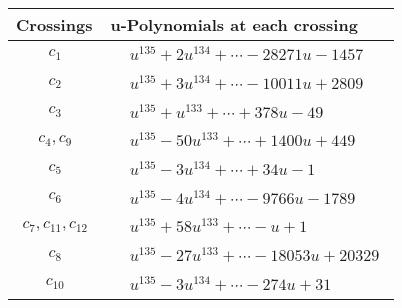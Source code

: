 \documentclass[1p]{elsarticle_modified}
\theoremstyle{definition}
\begin{document}
\begin{tabular}{m{50pt}|m{274pt}}
Crossings & \hspace{64pt}u-Polynomials at each crossing \\
\hline $$\begin{aligned}c_{1}\end{aligned}$$&$\begin{aligned}
&u^{135}+2 u^{134}+\cdots-28271 u-1457
\end{aligned}$\\
\hline $$\begin{aligned}c_{2}\end{aligned}$$&$\begin{aligned}
&u^{135}+3 u^{134}+\cdots-10011 u+2809
\end{aligned}$\\
\hline $$\begin{aligned}c_{3}\end{aligned}$$&$\begin{aligned}
&u^{135}+u^{133}+\cdots+378 u-49
\end{aligned}$\\
\hline $$\begin{aligned}c_{4},c_{9}\end{aligned}$$&$\begin{aligned}
&u^{135}-50 u^{133}+\cdots+1400 u+449
\end{aligned}$\\
\hline $$\begin{aligned}c_{5}\end{aligned}$$&$\begin{aligned}
&u^{135}-3 u^{134}+\cdots+34 u-1
\end{aligned}$\\
\hline $$\begin{aligned}c_{6}\end{aligned}$$&$\begin{aligned}
&u^{135}-4 u^{134}+\cdots-9766 u-1789
\end{aligned}$\\
\hline $$\begin{aligned}c_{7},c_{11},c_{12}\end{aligned}$$&$\begin{aligned}
&u^{135}+58 u^{133}+\cdots- u+1
\end{aligned}$\\
\hline $$\begin{aligned}c_{8}\end{aligned}$$&$\begin{aligned}
&u^{135}-27 u^{133}+\cdots-18053 u+20329
\end{aligned}$\\
\hline $$\begin{aligned}c_{10}\end{aligned}$$&$\begin{aligned}
&u^{135}-3 u^{134}+\cdots-274 u+31
\end{aligned}$\\
\hline
\end{tabular}\\~\\
\end{document}
